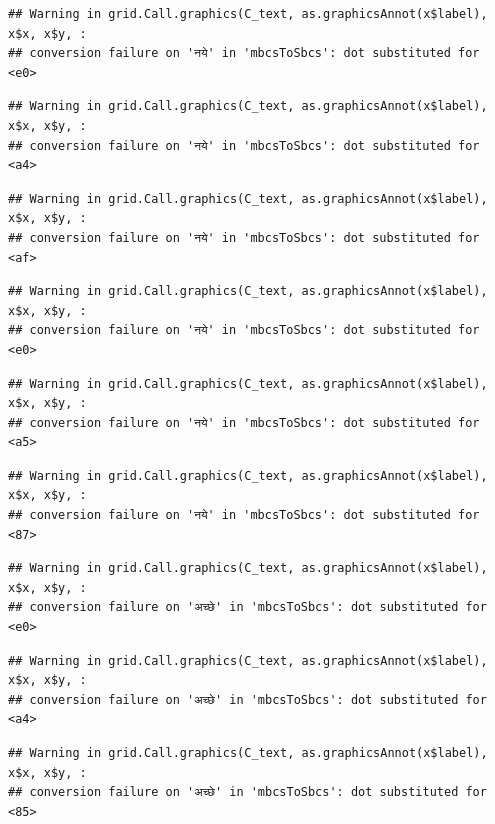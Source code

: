 \documentclass[
]{article}
\begin{document}
\begin{verbatim}
## Warning in grid.Call.graphics(C_text, as.graphicsAnnot(x$label), x$x, x$y, :
## conversion failure on 'नये' in 'mbcsToSbcs': dot substituted for <e0>
\end{verbatim}

\begin{verbatim}
## Warning in grid.Call.graphics(C_text, as.graphicsAnnot(x$label), x$x, x$y, :
## conversion failure on 'नये' in 'mbcsToSbcs': dot substituted for <a4>
\end{verbatim}

\begin{verbatim}
## Warning in grid.Call.graphics(C_text, as.graphicsAnnot(x$label), x$x, x$y, :
## conversion failure on 'नये' in 'mbcsToSbcs': dot substituted for <af>
\end{verbatim}

\begin{verbatim}
## Warning in grid.Call.graphics(C_text, as.graphicsAnnot(x$label), x$x, x$y, :
## conversion failure on 'नये' in 'mbcsToSbcs': dot substituted for <e0>
\end{verbatim}

\begin{verbatim}
## Warning in grid.Call.graphics(C_text, as.graphicsAnnot(x$label), x$x, x$y, :
## conversion failure on 'नये' in 'mbcsToSbcs': dot substituted for <a5>
\end{verbatim}

\begin{verbatim}
## Warning in grid.Call.graphics(C_text, as.graphicsAnnot(x$label), x$x, x$y, :
## conversion failure on 'नये' in 'mbcsToSbcs': dot substituted for <87>
\end{verbatim}

\begin{verbatim}
## Warning in grid.Call.graphics(C_text, as.graphicsAnnot(x$label), x$x, x$y, :
## conversion failure on 'अच्छे' in 'mbcsToSbcs': dot substituted for <e0>
\end{verbatim}

\begin{verbatim}
## Warning in grid.Call.graphics(C_text, as.graphicsAnnot(x$label), x$x, x$y, :
## conversion failure on 'अच्छे' in 'mbcsToSbcs': dot substituted for <a4>
\end{verbatim}

\begin{verbatim}
## Warning in grid.Call.graphics(C_text, as.graphicsAnnot(x$label), x$x, x$y, :
## conversion failure on 'अच्छे' in 'mbcsToSbcs': dot substituted for <85>
\end{verbatim}
\end{document}
